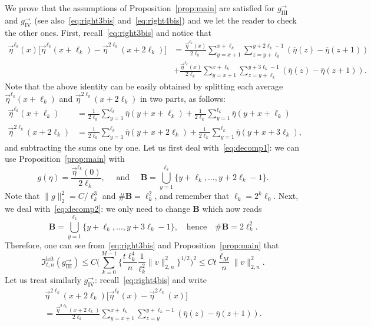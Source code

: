 \documentclass[AHL,Unicode,longabstracts]{cedram}
\newcommand{\bfB}{\mathbf{B}}
\newcommand*{\rmleft}{\mathrm{left}}
\newcommand*{\rmIII}{\mathrm{III}}
\newcommand*{\rmIV}{\mathrm{IV}}
\newcommand{\mf}[1]{{\mathfrak #1}}
\renewcommand\vec[1]{\overrightarrow{#1}}
\renewcommand{\bar}{\overline}
\renewcommand{\leq}{\leqslant}
\begin{document}
We prove that the assumptions of Proposition~\ref{prop:main} are satisfied for $g_{\rmIII}^\rightarrow$ and $g_{\rmIV}^\rightarrow$ (see also~\eqref{eq:right3bis} and~\eqref{eq:right4bis}) and we let the reader to check the other ones. First, recall~\eqref{eq:right3bis} and notice that
\begin{align}\label{eq:decomp1}
\vec\eta^{\ell_k}(x)\Big[\vec\eta^{\ell_k}(x+\ell_k)-\vec\eta^{2\ell_k}(x+2\ell_k)\Big] & = \frac{\vec\eta^{\ell_k}(x)}{2\ell_k}\sum_{y=x+1}^{x+\ell_k} \sum_{z=y+\ell_k}^{y+2\ell_k-1} (\bar\eta(z)-\bar\eta(z+1)) \!\!
\\ \label{eq:decomp2}
& + \frac{\vec\eta^{\ell_k}(x)}{2\ell_k} \sum_{y=x+1}^{x+\ell_k} \sum_{z=y+\ell_k}^{y+3\ell_k-1} (\bar\eta(z)-\bar\eta(z+1)). \!\!
\end{align}
Note that the above identity can be easily obtained by splitting each average $\vec\eta^{\ell_k}(x+\ell_k)$ and $\vec\eta^{2\ell_k}(x+2\ell_k)$ in two parts, as follows:
\begin{align*}
\vec\eta^{\ell_k}(x+\ell_k) & = \frac{1}{2\ell_k} \sum_{y=1}^{\ell_k} \bar\eta(y+x+\ell_k) + \frac{1}{2\ell_k} \sum_{y=1}^{\ell_k} \bar\eta(y+x+\ell_k) \\
\vec\eta^{2\ell_k}(x+2\ell_k) & = \frac{1}{2\ell_k} \sum_{y=1}^{\ell_k} \bar\eta(y+x+2\ell_k) + \frac{1}{2\ell_k} \sum_{y=1}^{\ell_k} \bar\eta(y+x+3\ell_k),
\end{align*}
and subtracting the sums one by one. Let us first deal with~\eqref{eq:decomp1}: we can use Proposition~\ref{prop:main} with
\[
g(\eta) = \frac{\vec\eta^{\ell_k}(0)}{2\ell_k}, \quad \text{ and } \quad {\bfB} = \bigcup_{y=1}^{\ell_k} \big\{ y+\ell_k, \dots, y+2\ell_k-1\big\}.
\]
Note that $\|g \|_2^2 = C/\ell_k^3$ and $\#{\bfB}=\ell_k^2$, and remember that $\ell_k=2^k\ell_0$. Next, we deal with~\eqref{eq:decomp2}: we only need to change ${\bfB}$ which now reads
\[
{\bfB} = \bigcup_{y=1}^{\ell_k} \big\{ y+\ell_k, \dots, y+3\ell_k-1\big\}, \quad \mathrm{hence} \quad \#{\bfB}=2\ell_k^2.
\]
Therefore, one can see from~\eqref{eq:right3bis} and Proposition~\ref{prop:main} that
\[
\mf I_{t,n}^{\rmleft}(g^\rightarrow_{\rmIII}) \leq C\bigg(\sum_{k=0}^{M-1} \bigg\{ \frac{t\ell_k^4}{n}\frac{1}{\ell_k^2}\|v\|_{2,n}^2\bigg\}^{1/2}\bigg)^2 \leq Ct \frac{\ell_{M}}{n}\|v\|_{2,n}^2.
\]
Let us treat similarly $g_{\rmIV}^\rightarrow$: recall~\eqref{eq:right4bis} and write
\begin{multline}
\vec\eta^{2\ell_k}(x+2\ell_k)\Big[\vec\eta^{\ell_k}(x)-\vec\eta^{2\ell_k}(x)\Big] \\= \frac{\vec\eta^{2\ell_k}(x+2\ell_k)}{2\ell_k}\sum_{y=x+1}^{x+\ell_k} \sum_{z=y}^{y+\ell_k-1} (\bar\eta(z)-\bar\eta(z+1)). \label{eq:decomp3}
\end{multline}
\end{document}
